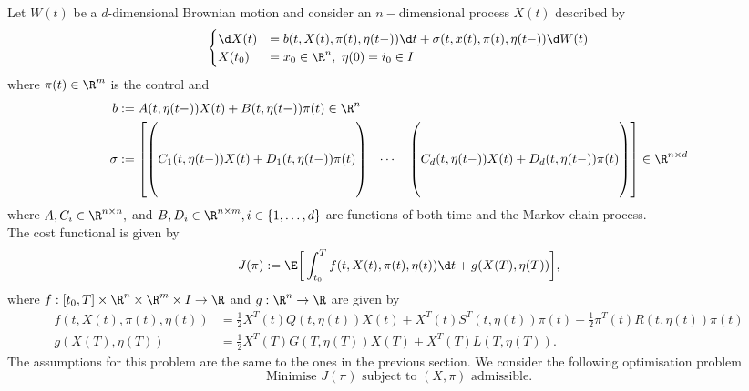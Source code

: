 Let $W(t)$ be a $d$-dimensional Brownian motion and consider an $n-$dimensional process $X(t)$ described by
\begin{equation}
    \begin{cases}
        \d X(t) &= b(t, X(t),\pi(t), \eta(t-)) \d t + \sigma(t, x(t), \pi(t), \eta(t-)) \d W(t)\\
         X(t_0) &= x_0 \in \R^n, \, \, \eta(0) = i_0 \in I
    \end{cases}
    \label{eq: markov_sde}
\end{equation}
where $\pi(t) \in \R^m$ is the control and
\begin{align*}
    b&:= A(t, \eta(t-)) X(t) + B(t, \eta(t-)) \pi (t) \in \R^{n}\\
    \sigma &:= 
    \begin{bmatrix}
        \begin{pmatrix}
            \\
            \\
            C_1(t, \eta(t-)) X(t) + D_1(t, \eta(t-)) \pi(t)\\
            \\
            \\
        \end{pmatrix} 
        & \cdots & 
        \begin{pmatrix}
            \\
            \\
            C_d(t, \eta(t-)) X(t) + D_d(t, \eta(t-)) \pi(t)\\
            \\
            \\
        \end{pmatrix}
    \end{bmatrix}
    \in \R^{n \times d}
\end{align*}
where $A, C_i \in \R^{n \times n},$ and $B, D_i \in \R^{n \times m}, i \in \{1, \dots, d \}$ are functions of both time and the Markov chain process.\\

The cost functional is given by
\begin{equation}
    J(\pi) := \E \bigg[ \int_{t_0}^T f(t, X(t), \pi(t), \eta(t)) \d t + g(X(T), \eta(T))\bigg], \label{eq: markov_cost_functional}
\end{equation}
where $f: [t_0, T] \times \R^n \times \R^m \times I \to \R$ and $g: \R^n \to \R$ are given by
\begin{align*}
    f(t, X(t), \pi(t), \eta(t)) &= \frac{1}{2} X^T(t) Q(t, \eta(t)) X(t) + X^T(t) S^T(t, \eta(t)) \pi(t) + \frac{1}{2}\pi^T(t) R(t, \eta(t)) \pi(t)\\
    g(X(T), \eta(T)) &= \frac12 X^T(T) G(T, \eta(T)) X(T) + X^T(T) L(T, \eta(T)).
\end{align*}
The assumptions for this problem are the same to the ones in the previous section. We consider the following optimisation problem
\begin{equation}
    \text{Minimise } J(\pi) \text{ subject to } (X, \pi) \text{ admissible}.  \label{eq: markov_minimisation_problem}
\end{equation}


